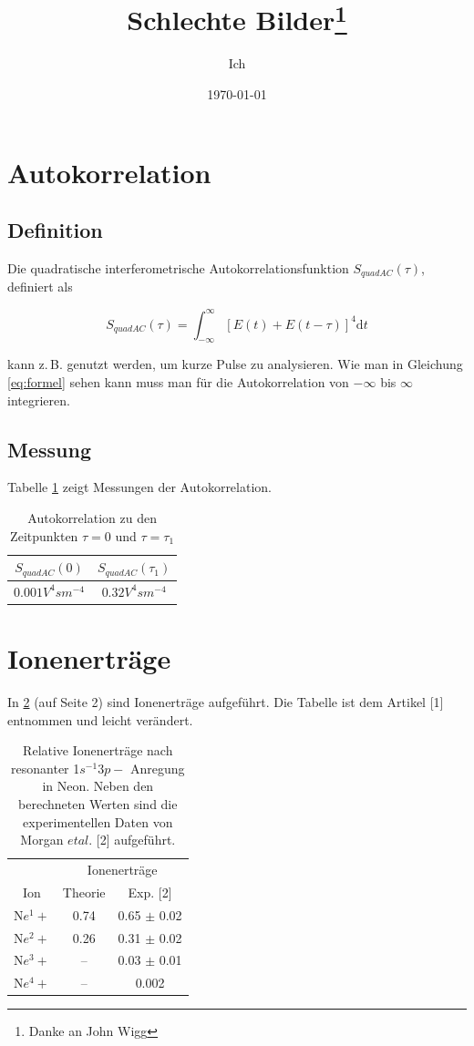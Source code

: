 \documentclass[a4paper, 10pt,onecolumn]{scrartcl}
\title{Schlechte Bilder\thanks{Danke an John Wigg}}
\author{Ich} %
\date{\today}
\begin{document}
\tableofcontents
\listoffigures

\section{Autokorrelation }
\subsection{Definition}

Die quadratische interferometrische Autokorrelationsfunktion $S_{quadAC}(\tau)$, definiert als
\begin{center}
	\begin{equation}
		S_{quadAC}(\tau)=\int_{-\infty}^{\infty}[E(t)+E(t-\tau)]^4\mathrm{d}t
		\label{eq:formel}
	\end{equation}
\end{center}
kann z.\,B. genutzt werden, um kurze Pulse zu analysieren. Wie man in Gleichung \eqref{eq:formel} sehen kann muss man für die Autokorrelation von $-\infty$ bis $\infty$ integrieren.

\subsection{Messung}
Tabelle \ref{Tabelle1} zeigt Messungen der Autokorrelation.
\begin{table}[h!]
\centering
\caption{Autokorrelation zu den Zeitpunkten $\tau =0$  und $\tau=\tau_1$}
\label{Tabelle1}
\begin{tabular}{|c|c|}
\hline \hline
$S_{quadAC}(0)$ & $S_{quadAC}(\tau_1)$\\ \hline
$0.001 V^4sm^{-4}$ & $0.32 V^4sm^{-4}$\\ \hline \hline
\end{tabular}
\end{table}
\section{Ionenerträge}

In \ref{Tabelle2} (auf Seite 2) sind Ionenerträge aufgeführt. Die Tabelle ist dem Artikel [1] entnommen und leicht verändert.

\begin{table}[!h]
\centering
\caption{Relative Ionenerträge nach resonanter 1$s^{-1}3p-$ Anregung in Neon. Neben den berechneten Werten sind die experimentellen Daten von Morgan $et al.$ [2] aufgeführt.}
\label{Tabelle2}
\begin{tabular}{ccc}
\hline \hline
&\multicolumn{2}{c}{Ionenerträge}\\ \cline{2-3}
Ion & Theorie & Exp. [2] \\ \hline
N$e^1+$ & 0.74 & 0.65 $\pm$ 0.02\\
N$e^2+$ & 0.26 & 0.31 $\pm$ 0.02 \\ 
N$e^3+$ & -- & 0.03 $\pm$ 0.01\\
N$e^4+$ & -- & 0.002\\
\hline \hline

\end{tabular}
\end{table}
\end{document}
